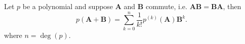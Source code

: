 \documentclass[12pt]{article}
\newcommand{\mv}[1]{\mathbf{#1}}
\begin{document}
Let $p$ be a polynomial and suppose $\mv{A}$ and $\mv{B}$ commute, i.e. $\mv{A}\mv{B}=\mv{B}\mv{A}$, then
\begin{displaymath}
p(\mv{A}+\mv{B})=\sum_{k=0}^{n}\frac{1}{k!}p^{(k)}(\mv{A})\mv{B}^k .
\end{displaymath}
where $n=\deg(p)$.
\end{document}
